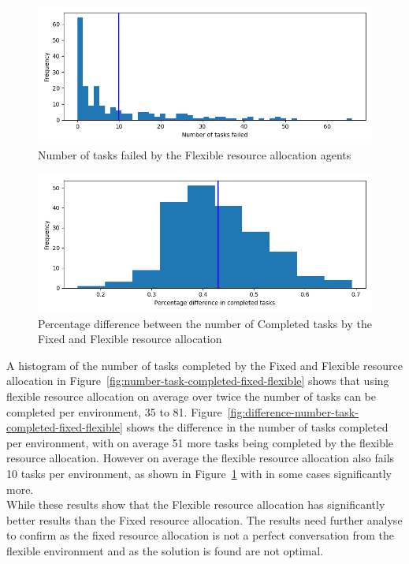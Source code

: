 \begin{figure}[H]
    \centering
    \includegraphics[width=\textwidth]{figures/5_evaluation_figs/flexible_failed_tasks.png}
    \caption{Number of tasks failed by the Flexible resource allocation agents}
    \label{fig:flexibe-failed-tasks}
\end{figure}

\begin{figure}[H]
    \centering
    \includegraphics[width=\textwidth]{figures/5_evaluation_figs/percent_difference.png}
    \caption{Percentage difference between the number of Completed tasks by the Fixed and Flexible resource allocation}
    \label{fig:completed-percent-difference}
\end{figure}

A histogram of the number of tasks completed by the Fixed and Flexible resource allocation in
Figure~\ref{fig:number-task-completed-fixed-flexible} shows that using flexible resource allocation on average
over twice the number of tasks can be completed per environment, 35 to 81.
Figure~\ref{fig:difference-number-task-completed-fixed-flexible} shows the difference in the number of tasks completed
per environment, with on average 51 more tasks being completed by the flexible resource allocation. However on average
the flexible resource allocation also fails 10 tasks per environment, as shown in Figure~\ref{fig:flexibe-failed-tasks}
with in some cases significantly more. \\
While these results show that the Flexible resource allocation has significantly better results than the Fixed resource
allocation. The results need further analyse to confirm as the fixed resource allocation is not a perfect conversation
from the flexible environment and as the solution is found are not optimal.

